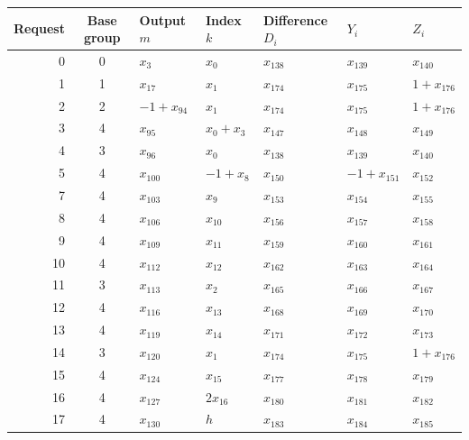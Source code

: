 \begin{center}\small
\begin{longtable}{rclllll}
\toprule Request & Base group & Output $m$ & Index $k$ & Difference $D_i$ & $Y_i$ & $Z_i$\\\midrule\endhead
0 & 0 & $x_{3}$ & $x_{0}$ & $x_{138}$ & $x_{139}$ & $x_{140}$\\
1 & 1 & $x_{17}$ & $x_{1}$ & $x_{174}$ & $x_{175}$ & $1 +x_{176}$\\
2 & 2 & $-1 +x_{94}$ & $x_{1}$ & $x_{174}$ & $x_{175}$ & $1 +x_{176}$\\
3 & 4 & $x_{95}$ & $x_{0} +x_{3}$ & $x_{147}$ & $x_{148}$ & $x_{149}$\\
4 & 3 & $x_{96}$ & $x_{0}$ & $x_{138}$ & $x_{139}$ & $x_{140}$\\
5 & 4 & $x_{100}$ & $-1 +x_{8}$ & $x_{150}$ & $-1 +x_{151}$ & $x_{152}$\\
7 & 4 & $x_{103}$ & $x_{9}$ & $x_{153}$ & $x_{154}$ & $x_{155}$\\
8 & 4 & $x_{106}$ & $x_{10}$ & $x_{156}$ & $x_{157}$ & $x_{158}$\\
9 & 4 & $x_{109}$ & $x_{11}$ & $x_{159}$ & $x_{160}$ & $x_{161}$\\
10 & 4 & $x_{112}$ & $x_{12}$ & $x_{162}$ & $x_{163}$ & $x_{164}$\\
11 & 3 & $x_{113}$ & $x_{2}$ & $x_{165}$ & $x_{166}$ & $x_{167}$\\
12 & 4 & $x_{116}$ & $x_{13}$ & $x_{168}$ & $x_{169}$ & $x_{170}$\\
13 & 4 & $x_{119}$ & $x_{14}$ & $x_{171}$ & $x_{172}$ & $x_{173}$\\
14 & 3 & $x_{120}$ & $x_{1}$ & $x_{174}$ & $x_{175}$ & $1 +x_{176}$\\
15 & 4 & $x_{124}$ & $x_{15}$ & $x_{177}$ & $x_{178}$ & $x_{179}$\\
16 & 4 & $x_{127}$ & $2x_{16}$ & $x_{180}$ & $x_{181}$ & $x_{182}$\\
17 & 4 & $x_{130}$ & $h$ & $x_{183}$ & $x_{184}$ & $x_{185}$\\
\bottomrule\end{longtable}\end{center}
